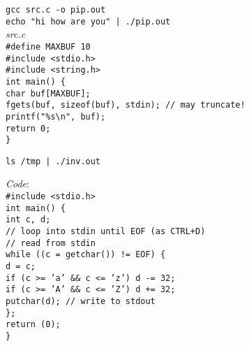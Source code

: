 \begin{flushleft}
\begin{flushleft}
    \begin{flushleft}
      \texttt{gcc src.c -o pip.out \\
              echo "hi how are you" | ./pip.out}\\
      \textit{src.c} \\
      \texttt{\#define MAXBUF 10\\
      \#include <stdio.h>\\
      \#include <string.h>\\
      int main() \{ \\
       \halftab char buf[MAXBUF]; \\
       \halftab fgets(buf, sizeof(buf), stdin); // may truncate!\\
       \halftab printf("\%s\textbackslash n", buf); \\
       \halftab return 0; \\
      \} }
    \end{flushleft}
    \begin{flushleft}
      \texttt{ls /tmp | ./inv.out} \par 
      \textit{Code}: \\
      \texttt{\#include <stdio.h>\\
      int main() \{ \\
       \halftab int c, d; \\
       \halftab // loop into stdin until EOF (as CTRL+D) \\
       \halftab // read from stdin \\
       \halftab while ((c = getchar()) != EOF) \{ \\
       \tab d = c; \\
       \tab if (c >= 'a' \&\& c <= 'z') d -= 32; \\
       \tab if (c >= 'A' \&\& c <= 'Z') d += 32; \\
       \tab putchar(d); // write to stdout \\
       \halftab \}; \\
       \halftab return (0); \\
      \} }
    \end{flushleft}
  \end{flushleft}
\end{flushleft}